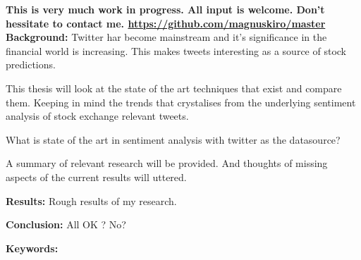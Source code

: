 \textbf{
This is very much work in progress. All input is welcome.
Don't hessitate to contact me. \url{https://github.com/magnuskiro/master} 
}\\

\textbf{Background:}
Twitter har become mainstream and it's significance in the financial world is
increasing. This makes tweets interesting as a source of stock predictions.

This thesis will look at the state of the art techniques that exist and
compare them. Keeping in mind the trends that crystalises from the underlying
sentiment analysis of stock exchange relevant tweets. 

What is state of the art in sentiment analysis with twitter as the datasource? 

A summary of relevant research will be provided. And thoughts of missing
aspects of the current results will uttered. 

\textbf{Results:} 
Rough results of my research. 

\textbf{Conclusion:} 
All OK ? No? 

\textbf{Keywords:}

